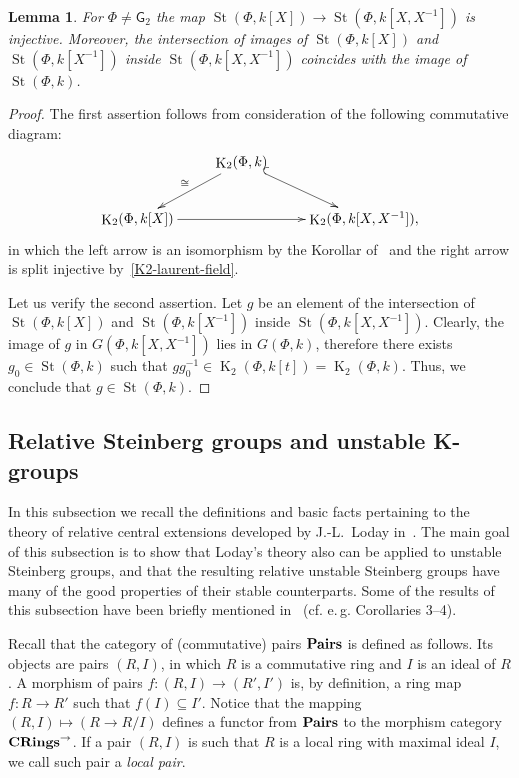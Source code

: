 \documentclass[oneside, 8pt]{amsart}
\newtheorem{lemma}{Lemma}
\theoremstyle{remark}
\theoremstyle{definition}
\numberwithin{lemma}{section}
\numberwithin{prop}{section}
\numberwithin{corollary}{section}
\numberwithin{externaltheorem}{section}
\DeclareMathOperator{\St}{St}
\DeclareMathOperator{\K}{K}
\newcommand{\inv}{^{-1}}
\newcommand{\catname}[1]{{\normalfont\textbf{#1}}} %
\newcommand{\rG}{\mathsf{G}}
\numberwithin{equation}{section}
\begin{document}
\begin{lemma} \label{field-injectivity} For $\Phi\neq\rG_2$ the map $\St(\Phi, k[X]) \to \St(\Phi, k[X, X^{-1}])$ is injective. Moreover, the intersection of images of $\St(\Phi, k[X])$ and $\St(\Phi, k[X\inv])$ inside $\St(\Phi, k[X, X\inv])$ coincides with the image of $\St(\Phi, k)$. \end{lemma}
\begin{proof} The first assertion follows from consideration of the following commutative diagram:
\[\xymatrix{ & \K_2(\Phi, k) \ar[dl]_{\cong} \ar@{^{(}->}[dr] & \\
               \K_2(\Phi, k[X]) \ar[rr] &               & \K_2(\Phi, k[X, X^{-1}]),} \]
in which the left arrow is an isomorphism by the Korollar of~\cite[Satz~1]{Re75} and the right arrow is split injective by~\cref{K2-laurent-field}. 

Let us verify the second assertion. Let $g$ be an element of the intersection of $\St(\Phi, k[X])$ and $\St(\Phi, k[X\inv])$ inside $\St(\Phi, k[X, X\inv])$.
Clearly, the image of $g$ in $G(\Phi, k[X, X\inv])$ lies in $G(\Phi, k)$, therefore there exists $g_0 \in \St(\Phi, k)$ such that $gg_0^{-1} \in \K_2(\Phi, k[t]) = \K_2(\Phi, k)$. Thus, we conclude that $g \in \St(\Phi, k)$.
\end{proof}

\subsection{Relative Steinberg groups and unstable K-groups} \label{sec:quillen}
In this subsection we recall the definitions and basic facts pertaining to the theory of relative central extensions developed by J.-L.~Loday in~\cite{Lo78}. The main goal of this subsection is to show that Loday's theory also can be applied to unstable Steinberg groups, and that the resulting relative unstable Steinberg groups have many of the good properties of their stable counterparts. Some of the results of this subsection have been briefly mentioned in~\cite{S15} (cf. e.\,g. Corollaries 3--4).

Recall that the category of (commutative) pairs $\catname{Pairs}$ is defined as follows.
Its objects are pairs $(R, I)$, in which $R$ is a commutative ring and $I$ is an ideal of $R$. A morphism of pairs $f \colon (R, I) \to (R', I')$ is, by definition, a ring map $f \colon R \to R'$ such that $f(I) \subseteq I'$. Notice that the mapping $(R, I) \mapsto (R \to R/I)$ defines a functor from $\catname{Pairs}$ to the morphism category $\catname{CRings}^\rightarrow$.
If a pair $(R, I)$ is such that $R$ is a local ring with maximal ideal $I$, we call such pair a {\it local pair}.
\end{document}
